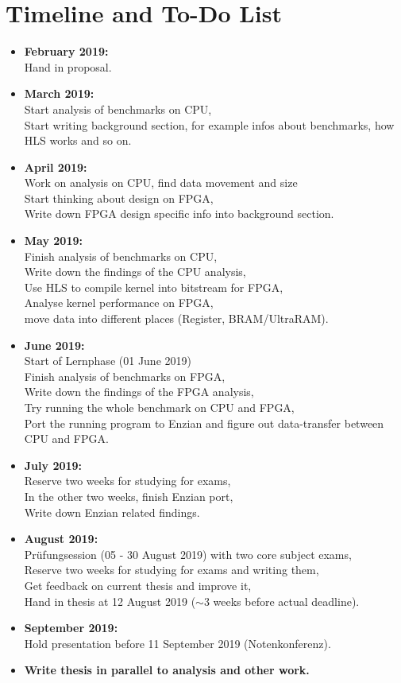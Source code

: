\documentclass[12pt]{article}
\begin{document}
\section*{Timeline and To-Do List}
\begin{itemize}
\item \textbf{February 2019:}\\
Hand in proposal.
\item \textbf{March 2019:}\\
Start analysis of benchmarks on CPU,\\
Start writing background section, for example infos about benchmarks, how HLS works and so on.
\item \textbf{April 2019:}\\
Work on analysis on CPU, find data movement and size\\
Start thinking about design on FPGA,\\
Write down FPGA design specific info into background section.
\item \textbf{May 2019:}\\
Finish analysis of benchmarks on CPU,\\
Write down the findings of the CPU analysis,\\
Use HLS to compile kernel into bitstream for FPGA,\\
Analyse kernel performance on FPGA,\\
move data into different places (Register, BRAM/UltraRAM).
\item \textbf{June 2019:}\\ 
Start of Lernphase (01 June 2019)\\
Finish analysis of benchmarks on FPGA,\\
Write down the findings of the FPGA analysis,\\
Try running the whole benchmark on CPU and FPGA,\\
Port the running program to Enzian and figure out data-transfer between CPU and FPGA.
\item \textbf{July 2019:}\\
Reserve two weeks for studying for exams,\\
In the other two weeks, finish Enzian port,\\
Write down Enzian related findings.
\item \textbf{August 2019:}\\
Prüfungsession (05 - 30 August 2019) with two core subject exams,\\
Reserve two weeks for studying for exams and writing them,\\
Get feedback on current thesis and improve it,\\
Hand in thesis at 12 August 2019 ($\sim$3 weeks before actual deadline).
\item \textbf{September 2019:}\\
Hold presentation before 11 September 2019 (Notenkonferenz).
\item \textbf{Write thesis in parallel to analysis and other work.}
\end{itemize}
\end{document}
